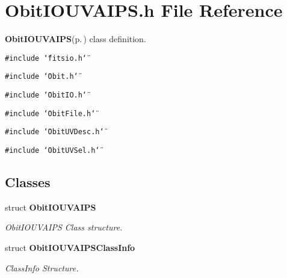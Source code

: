 \section{Obit\-IOUVAIPS.h File Reference}
\label{ObitIOUVAIPS_8h}
{\bf Obit\-IOUVAIPS}{\rm (p.\,\pageref{structObitIOUVAIPS})} class definition. 

{\tt \#include \char`\"{}fitsio.h\char`\"{}}\par
{\tt \#include \char`\"{}Obit.h\char`\"{}}\par
{\tt \#include \char`\"{}Obit\-IO.h\char`\"{}}\par
{\tt \#include \char`\"{}Obit\-File.h\char`\"{}}\par
{\tt \#include \char`\"{}Obit\-UVDesc.h\char`\"{}}\par
{\tt \#include \char`\"{}Obit\-UVSel.h\char`\"{}}\par
\subsection*{Classes}
\begin{CompactItemize}
\item 
struct {\bf Obit\-IOUVAIPS}
\begin{CompactList}\small\item\em Obit\-IOUVAIPS Class structure. \item\end{CompactList}\item 
struct {\bf Obit\-IOUVAIPSClass\-Info}
\begin{CompactList}\small\item\em Class\-Info Structure. \item\end{CompactList}\end{CompactItemize}
